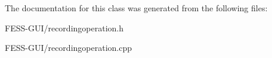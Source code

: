 The documentation for this class was generated from the following files\+:\begin{DoxyCompactItemize}
\item 
F\+E\+S\+S-\/\+G\+U\+I/recordingoperation.\+h\item 
F\+E\+S\+S-\/\+G\+U\+I/recordingoperation.\+cpp\end{DoxyCompactItemize}
